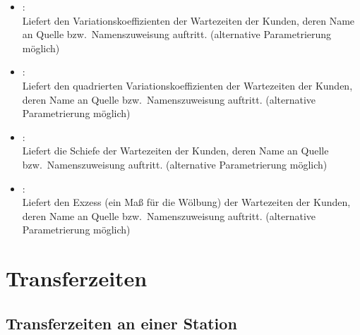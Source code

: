 \begin{itemize}
\item
{}:\\
Liefert den Variationskoeffizienten der Wartezeiten der Kunden, deren Name an Quelle bzw.\ Namenszuweisung  auftritt.
(alternative Parametrierung möglich)

\item
{}:\\
Liefert den quadrierten Variationskoeffizienten der Wartezeiten der Kunden, deren Name an Quelle bzw.\ Namenszuweisung  auftritt.
(alternative Parametrierung möglich)

\item
{}:\\
Liefert die Schiefe der Wartezeiten der Kunden, deren Name an Quelle bzw.\ Namenszuweisung  auftritt.
(alternative Parametrierung möglich)

\item
{}:\\
Liefert den Exzess (ein Maß für die Wölbung) der Wartezeiten der Kunden, deren Name an Quelle bzw.\ Namenszuweisung  auftritt.
(alternative Parametrierung möglich)

\end{itemize}



\section{Transferzeiten}



\subsection{Transferzeiten an einer Station}

